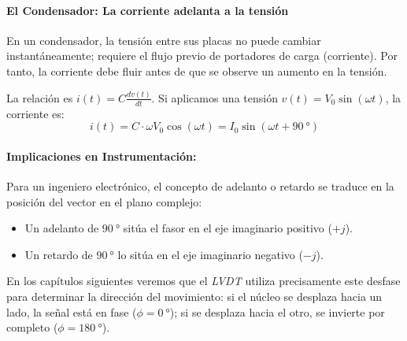 \paragraph{El Condensador: La corriente adelanta a la tensión}
En un condensador, la tensión entre sus placas no puede cambiar instantáneamente; requiere el flujo previo de portadores de carga (corriente). Por tanto, la corriente debe fluir antes de que se observe un aumento en la tensión.

La relación es $i(t) = C \frac{dv(t)}{dt}$. Si aplicamos una tensión $v(t) = V_0 \sin(\omega t)$, la corriente es:
\begin{equation}
    i(t) = C \cdot \omega V_0 \cos(\omega t) = I_0 \sin(\omega t + \qty{90}{\degree})
\end{equation}

\paragraph{Implicaciones en Instrumentación:}
Para un ingeniero electrónico, el concepto de adelanto o retardo se traduce en la posición del vector en el plano complejo:
\begin{itemize}
    \item Un adelanto de $\qty{90}{\degree}$ sitúa el fasor en el eje imaginario positivo ($+j$).
    \item Un retardo de $\qty{90}{\degree}$ lo sitúa en el eje imaginario negativo ($-j$).
\end{itemize}

En los capítulos siguientes veremos que el \emph{LVDT} utiliza precisamente este desfase para determinar la dirección del movimiento: si el núcleo se desplaza hacia un lado, la señal está en fase ($\phi=\qty{0}{\degree}$); si se desplaza hacia el otro, se invierte por completo ($\phi=\qty{180}{\degree}$).


